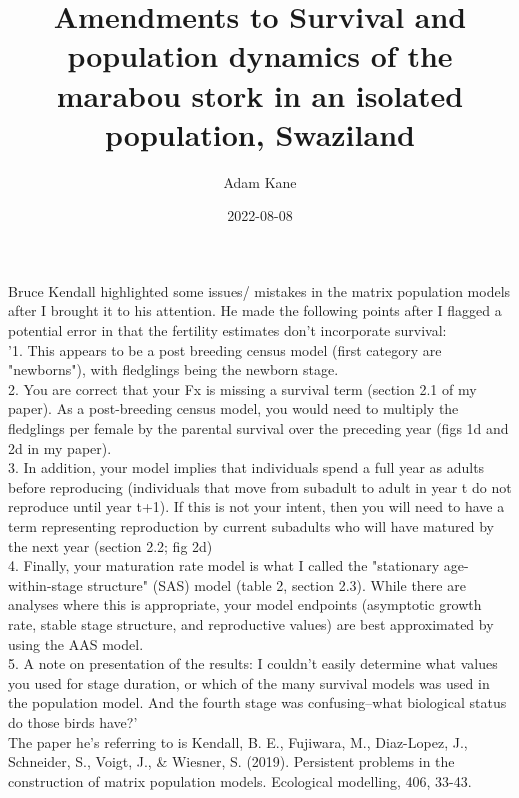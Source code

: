 \documentclass{article}
\title{Amendments to Survival and population dynamics of the marabou stork in an isolated population, Swaziland }
\date{2022-08-08}
\author{Adam Kane}
\begin{document}
  \maketitle
  \newpage
  Bruce Kendall highlighted some issues/ mistakes in the matrix population models after I brought it to his attention. He made the following points after I flagged a potential error in that the fertility estimates don't incorporate survival: \\

  '1.	This appears to be a post breeding census model (first category are "newborns"), with fledglings being the newborn stage.\\

  2.	You are correct that your Fx is missing a survival term (section 2.1 of my paper). As a post-breeding census model, you would need to multiply the fledglings per female by the parental survival over the preceding year (figs 1d and 2d in my paper).\\

  3.	In addition, your model implies that individuals spend a full year as adults before reproducing (individuals that move from subadult to adult in year t do not reproduce until year t+1). If this is not your intent, then you will need to have a term representing reproduction by current subadults who will have matured by the next year (section 2.2; fig 2d)\\

  4.	Finally, your maturation rate model is what I called the "stationary age-within-stage structure" (SAS) model (table 2, section 2.3). While there are analyses where this is appropriate, your model endpoints (asymptotic growth rate, stable stage structure, and reproductive values) are best approximated by using the AAS model.\\

  5.	A note on presentation of the results: I couldn't easily determine what values you used for stage duration, or which of the many survival models was used in the population model. And the fourth stage was confusing--what biological status do those birds have?'\\
  

  The paper he’s referring to is Kendall, B. E., Fujiwara, M., Diaz-Lopez, J., Schneider, S., Voigt, J., \& Wiesner, S. (2019). Persistent problems in the construction of matrix population models. Ecological modelling, 406, 33-43.
\end{document}
